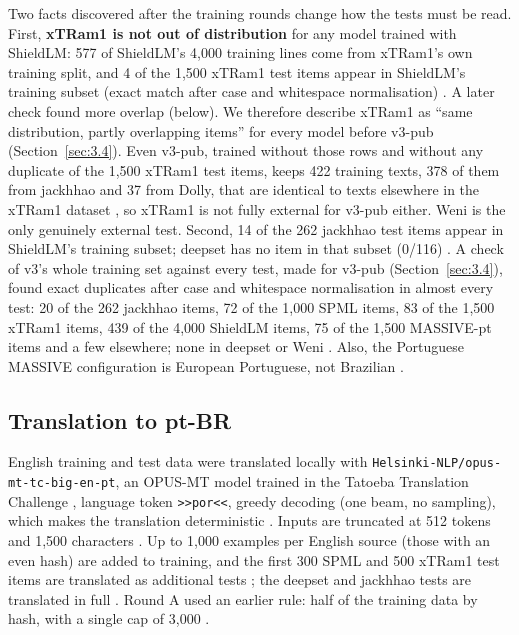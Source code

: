 \documentclass[11pt]{article}
\newcommand{\code}[1]{\texttt{#1}}
\begin{document}
Two facts discovered after the training rounds change how the tests must be read. First, \textbf{xTRam1 is not out of distribution} for any model trained with ShieldLM: 577 of ShieldLM's 4,000 training lines come from xTRam1's own training split, and 4 of the 1,500 xTRam1 test items appear in ShieldLM's training subset (exact match after case and whitespace normalisation)%
. A later check found more overlap (below). We therefore describe xTRam1 as ``same distribution, partly overlapping items'' for every model before v3-pub (Section~\ref{sec:3.4}). Even v3-pub, trained without those rows and without any duplicate of the 1,500 xTRam1 test items, keeps 422 training texts, 378 of them from jackhhao and 37 from Dolly, that are identical to texts elsewhere in the xTRam1 dataset%
, so xTRam1 is not fully external for v3-pub either. Weni is the only genuinely external test. Second, 14 of the 262 jackhhao test items appear in ShieldLM's training subset; deepset has no item in that subset (0/116)%
. A check of v3's whole training set against every test, made for v3-pub (Section~\ref{sec:3.4}), found exact duplicates after case and whitespace normalisation in almost every test: 20 of the 262 jackhhao items, 72 of the 1,000 SPML items, 83 of the 1,500 xTRam1 items, 439 of the 4,000 ShieldLM items, 75 of the 1,500 MASSIVE-pt items and a few elsewhere; none in deepset or Weni%
. Also, the Portuguese MASSIVE configuration is European Portuguese, not Brazilian%
.

\subsection{Translation to pt-BR}\label{sec:3.2}

English training and test data were translated locally with \code{Helsinki-\allowbreak{}NLP/\allowbreak{}opus-\allowbreak{}mt-\allowbreak{}tc-\allowbreak{}big-\allowbreak{}en-\allowbreak{}pt}, an OPUS-MT model trained in the Tatoeba Translation Challenge \citep{tiedemann2020opusmt, tiedemann2020tatoeba, helsinki2022opusmtenpt}, language token \code{\textgreater{}\textgreater{}por\textless{}\textless{}}, greedy decoding (one beam, no sampling), which makes the translation deterministic%
. Inputs are truncated at 512 tokens and 1,500 characters%
. Up to 1,000 examples per English source (those with an even hash) are added to training, and the first 300 SPML and 500 xTRam1 test items are translated as additional tests%
; the deepset and jackhhao tests are translated in full%
. Round A used an earlier rule: half of the training data by hash, with a single cap of 3,000%
.
\end{document}
